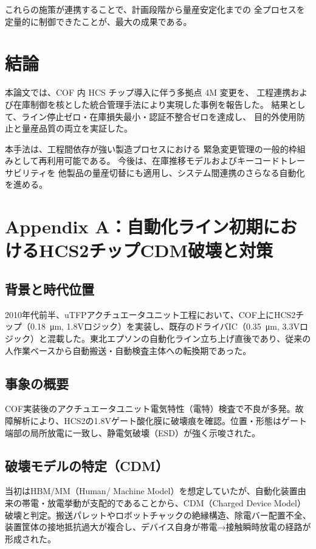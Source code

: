 \documentclass[journal,twocolumn]{IEEEtran}
\begin{document}
これらの施策が連携することで、計画段階から量産安定化までの
全プロセスを定量的に制御できたことが、最大の成果である。

\section{結論}

本論文では、COF 内 HCS チップ導入に伴う多拠点 4M 変更を、
工程連携および在庫制御を核とした統合管理手法により実現した事例を報告した。
結果として、ライン停止ゼロ・在庫損失最小・認証不整合ゼロを達成し、
目的外使用防止と量産品質の両立を実証した。

本手法は、工程間依存が強い製造プロセスにおける
緊急変更管理の一般的枠組みとして再利用可能である。
今後は、在庫推移モデルおよびキーコードトレーサビリティを
他製品の量産切替にも適用し、システム間連携のさらなる自動化を進める。

\appendices
\section{Appendix A：自動化ライン初期におけるHCS2チップCDM破壊と対策}

\subsection{背景と時代位置}
2010年代前半、uTFPアクチュエータユニット工程において、COF上にHCS2チップ（\SI{0.18}{\micro\meter}, 1.8Vロジック）を実装し、既存のドライバIC（\SI{0.35}{\micro\meter}, 3.3Vロジック）と混載した。東北エプソンの自動化ライン立ち上げ直後であり、従来の人作業ベースから自動搬送・自動検査主体への転換期であった。

\subsection{事象の概要}
COF実装後のアクチュエータユニット電気特性（電特）検査で不良が多発。故障解析により、HCS2の1.8Vゲート酸化膜に破壊痕を確認。位置・形態はゲート端部の局所放電に一致し、静電気破壊（ESD）が強く示唆された。

\subsection{破壊モデルの特定（CDM）}
当初はHBM/MM（Human/ Machine Model）を想定していたが、自動化装置由来の帯電・放電挙動が支配的であることから、CDM（Charged Device Model）破壊と判定。搬送パレットやロボットチャックの絶縁構造、除電バー配置不全、装置筐体の接地抵抗過大が複合し、デバイス自身が帯電→接触瞬時放電の経路が形成された。
\end{document}
